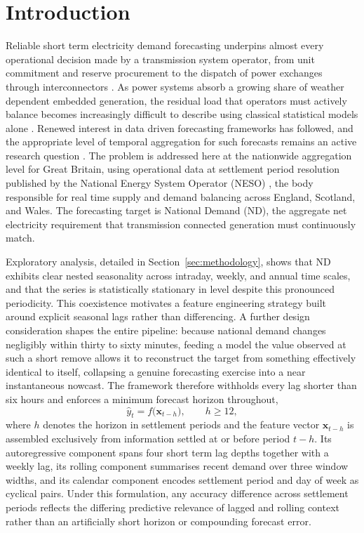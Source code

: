 \documentclass[runningheads]{llncs}
\begin{document}
\section{Introduction}
\label{sec:intro}

Reliable short term electricity demand forecasting underpins almost every operational decision made by a transmission system operator, from unit commitment and reserve procurement to the dispatch of power exchanges through interconnectors \cite{hyndman2018forecasting}. As power systems absorb a growing share of weather dependent embedded generation, the residual load that operators must actively balance becomes increasingly difficult to describe using classical statistical models alone \cite{taylor2012short,fan2012short}. Renewed interest in data driven forecasting frameworks has followed, and the appropriate level of temporal aggregation for such forecasts remains an active research question \cite{sevlian2018scaling}. The problem is addressed here at the nationwide aggregation level for Great Britain, using operational data at settlement period resolution published by the National Energy System Operator (NESO) \cite{neso2025historic}, the body responsible for real time supply and demand balancing across England, Scotland, and Wales. The forecasting target is National Demand (ND), the aggregate net electricity requirement that transmission connected generation must continuously match.

Exploratory analysis, detailed in Section~\ref{sec:methodology}, shows that ND exhibits clear nested seasonality across intraday, weekly, and annual time scales, and that the series is statistically stationary in level despite this pronounced periodicity. This coexistence motivates a feature engineering strategy built around explicit seasonal lags rather than differencing. A further design consideration shapes the entire pipeline: because national demand changes negligibly within thirty to sixty minutes, feeding a model the value observed at such a short remove allows it to reconstruct the target from something effectively identical to itself, collapsing a genuine forecasting exercise into a near instantaneous nowcast. The framework therefore withholds every lag shorter than six hours and enforces a minimum forecast horizon throughout,
\begin{equation}
\hat{y}_{t} = f\big(\mathbf{x}_{t-h}\big), \qquad h \geq 12,
\label{eq:direct_forecast}
\end{equation}
where $h$ denotes the horizon in settlement periods and the feature vector $\mathbf{x}_{t-h}$ is assembled exclusively from information settled at or before period $t-h$. Its autoregressive component spans four short term lag depths together with a weekly lag, its rolling component summarises recent demand over three window widths, and its calendar component encodes settlement period and day of week as cyclical pairs. Under this formulation, any accuracy difference across settlement periods reflects the differing predictive relevance of lagged and rolling context rather than an artificially short horizon or compounding forecast error.
\end{document}
